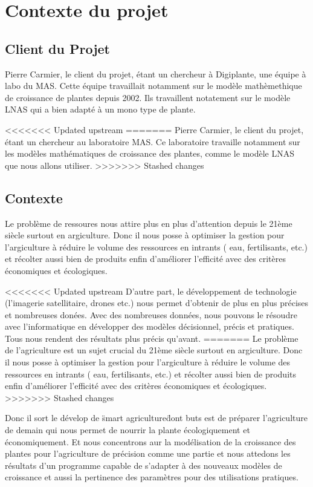 \section{Contexte du projet}

\subsection{Client du Projet}
Pierre Carmier, le client du projet, étant un chercheur à Digiplante,
une équipe à labo du MAS. Cette équipe travaillait notamment sur le modèle
mathèmethique de croissance de plantes depuis 2002. 
Ils travaillent notatement sur le modèle LNAS qui a bien adapté
à un mono type de plante.

<<<<<<< Updated upstream
=======
Pierre Carmier, le client du projet, \'etant un chercheur au laboratoire MAS. Ce laboratoire travaille notamment sur les modèles mathématiques de croissance des plantes, comme le modèle LNAS que nous allons utiliser.
>>>>>>> Stashed changes
\subsection{Contexte}
Le problème de ressoures nous attire plus en plus d'attention depuis le 21ème siècle
surtout en argiculture. Donc il nous posse à optimiser la gestion pour l'argiculture
à réduire le volume des ressources en intrants ( eau, fertilisants, etc.)
et récolter aussi bien de produits enfin d'améliorer l'efficité
avec des critères économiques et écologiques.

<<<<<<< Updated upstream
D'autre part, le développement de technologie (l'imagerie satellitaire, drones etc.)
nous permet d'obtenir de plus en plus précises et nombreuses donées. 
Avec des nombreuses données, nous pouvons le résoudre avec l'informatique en
développer des modèles décisionnel, précis et pratiques. 
Tous nous rendent des résultats plus précis qu'avant.
=======
Le probl\`eme de l'agriculture est un sujet crucial du  21\`eme si\`ecle surtout en argiculture. Donc il nous posse \`a optimiser la gestion pour l'argiculture \`a r\'eduire le volume des ressources en intrants ( eau, fertilisants, etc.) et r\'ecolter aussi bien de produits enfin d'am\'eliorer l'efficit\'e avec des crit\`eres \'economiques et \'ecologiques.
>>>>>>> Stashed changes

Donc il sort le dévelop de \"smart agriculture\" dont buts est de préparer
l'agriculture de demain qui nous permet de nourrir la plante écologiquement et
économiquement. Et nous concentrons aur la modélisation de la croissance des plantes
pour l'agriculture de précision comme une partie et nous attedons les résultats 
d'un programme capable de s'adapter à des nouveaux modèles de croissance et 
aussi la pertinence des paramètres pour des utilisations pratiques. 

